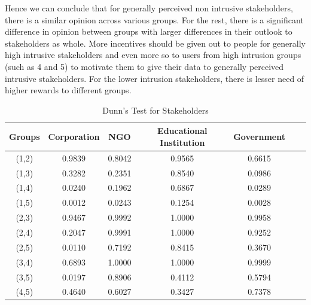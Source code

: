 Hence we can conclude that for generally perceived non intrusive stakeholders, there is a similar opinion across various groups. For the rest, there is a significant difference in opinion between groups with larger differences in their outlook to stakeholders as whole. More incentives should be given out to people for generally high intrusive stakeholders and even more so to users from high intrusion groups (such as 4 and 5) to motivate them to give their data to generally perceived intrusive stakeholders. For the lower intrusion stakeholders, there is lesser need of higher rewards to different groups.

\begin{table}[h!]
  \centering
  \caption{Dunn's Test for Stakeholders}
  \label{tab:dunn_stak}
  \begin{tabular}{ccccccc}
    \toprule
     Groups & Corporation & NGO & Educational Institution & Government \\
    \midrule
    (1,2) & 0.9839 & 0.8042 & 0.9565 & 0.6615 \\
    (1,3) & 0.3282 & 0.2351 & 0.8540 & 0.0986 \\
    (1,4) & 0.0240 & 0.1962 & 0.6867 & 0.0289 \\
    (1,5) & 0.0012 & 0.0243 & 0.1254 & 0.0028 \\
    (2,3) & 0.9467 & 0.9992 & 1.0000 & 0.9958 \\
    (2,4) & 0.2047 & 0.9991 & 1.0000 & 0.9252  \\
    (2,5) & 0.0110 & 0.7192 & 0.8415 & 0.3670  \\
    (3,4) & 0.6893 & 1.0000 & 1.0000 & 0.9999 \\
    (3,5) & 0.0197 & 0.8906 & 0.4112 & 0.5794  \\
    (4,5) & 0.4640 & 0.6027 & 0.3427 & 0.7378 \\
    \bottomrule
  \end{tabular}
\end{table}  

